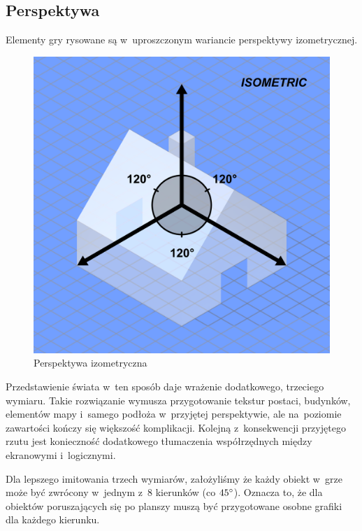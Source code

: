 \documentclass[licencjacka]{pracamgr}
\begin{document}
    \subsection{Perspektywa}
      Elementy gry rysowane są w~uproszczonym wariancie perspektywy izometrycznej.

      \begin{figure}[htbp]
	\centering
	\includegraphics[scale=0.25]{izo.png}
	\caption{Perspektywa izometryczna\protect\footnotemark}
      \end{figure}


      Przedstawienie świata w~ten sposób daje wrażenie dodatkowego, trzeciego wymiaru. Takie rozwiązanie wymusza przygotowanie tekstur
      postaci, budynków, elementów mapy i~samego podłoża w~przyjętej perspektywie, ale na~poziomie
      zawartości kończy się większość komplikacji. Kolejną z~konsekwencji przyjętego rzutu jest konieczność dodatkowego tłumaczenia
      współrzędnych między ekranowymi i~logicznymi.

      Dla lepszego imitowania trzech wymiarów, założyliśmy że każdy obiekt w~grze może być zwrócony w~jednym z~8 kierunków
      (co $45\degree$). Oznacza to, że dla obiektów poruszających się po planszy muszą być przygotowane osobne grafiki dla każdego kierunku.
\end{document}
